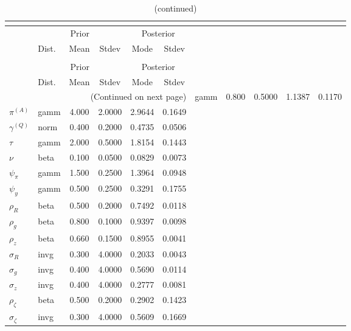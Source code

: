 
\begin{center}
\begin{longtable}{llcccc} 
\caption{Results from posterior maximization (parameters)}\\
 \label{Table:Posterior:1}\\
\toprule 
  & \multicolumn{3}{c}{Prior}  &  \multicolumn{2}{c}{Posterior} \\
  \cmidrule(r{.75em}){2-4} \cmidrule(r{.75em}){5-6}
  & Dist. & Mean  & Stdev & Mode & Stdev \\ 
\midrule \endfirsthead 
\caption{(continued)}\\
 \bottomrule 
  & \multicolumn{3}{c}{Prior}  &  \multicolumn{2}{c}{Posterior} \\
  \cmidrule(r{.75em}){2-4} \cmidrule(r{.75em}){5-6}
  & Dist. & Mean  & Stdev & Mode & Stdev \\ 
\midrule \endhead 
\bottomrule \multicolumn{6}{r}{(Continued on next page)}\endfoot 
\bottomrule\endlastfoot 
${r_{A}}$ & gamm &   0.800 & 0.5000 &   1.1387 &  0.1170 \\ 
${\pi^{(A)}}$ & gamm &   4.000 & 2.0000 &   2.9644 &  0.1649 \\ 
${\gamma^{(Q)}}$ & norm &   0.400 & 0.2000 &   0.4735 &  0.0506 \\ 
${\tau}$ & gamm &   2.000 & 0.5000 &   1.8154 &  0.1443 \\ 
${\nu}$ & beta &   0.100 & 0.0500 &   0.0829 &  0.0073 \\ 
${\psi_\pi}$ & gamm &   1.500 & 0.2500 &   1.3964 &  0.0948 \\ 
${\psi_y}$ & gamm &   0.500 & 0.2500 &   0.3291 &  0.1755 \\ 
${\rho_R}$ & beta &   0.500 & 0.2000 &   0.7492 &  0.0118 \\ 
${\rho_{g}}$ & beta &   0.800 & 0.1000 &   0.9397 &  0.0098 \\ 
${\rho_z}$ & beta &   0.660 & 0.1500 &   0.8955 &  0.0041 \\ 
${\sigma_R}$ & invg &   0.300 & 4.0000 &   0.2033 &  0.0043 \\ 
${\sigma_{g}}$ & invg &   0.400 & 4.0000 &   0.5690 &  0.0114 \\ 
${\sigma_z}$ & invg &   0.400 & 4.0000 &   0.2777 &  0.0081 \\ 
${\rho_\zeta}$ & beta &   0.500 & 0.2000 &   0.2902 &  0.1423 \\ 
${\sigma_\zeta}$ & invg &   0.300 & 4.0000 &   0.5609 &  0.1669 \\ 
\end{longtable}
 \end{center}
